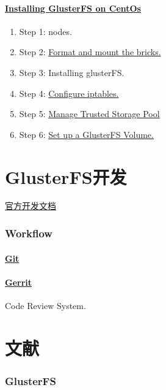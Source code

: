 \documentclass{article}
\begin{document}
\subsection{\href{https://wiki.centos.org/SpecialInterestGroup/Storage/gluster-Quickstart}{Installing GlusterFS on CentOs}}
\begin{enumerate}
\item Step 1: nodes.
\item Step 2: \href{https://gluster-documentations.readthedocs.io/en/latest/Administrator\%20Guide/Setting\%20Up\%20Volumes/}{Format and mount the bricks.}
\item Step 3: Installing glusterFS.
\item Step 4: \href{https://wiki.centos.org/HowTos/Network/IPTables}{Configure iptables.}
\item Step 5: \href{https://docs.gluster.org/en/v3/Administrator\%20Guide/Storage\%20Pools/}{Manage Trusted Storage Pool}
\item Step 6: \href{https://gluster-documentations.readthedocs.io/en/latest/Administrator\%20Guide/Setting\%20Up\%20Volumes/}{Set up a GlusterFS Volume.}
\end{enumerate}
\part{GlusterFS开发}
\href{https://docs.gluster.org/en/latest/Developer-guide/Developers-Index/\#contributing-to-the-gluster-community}{官方开发文档}
\section{Workflow}
\subsection*{\href{https://github.com/gluster/glusterfs}{Git}}
\subsection*{\href{review.gluster.org}{Gerrit}}
Code Review System.







\part{文献}
\section{GlusterFS}
\end{document}
